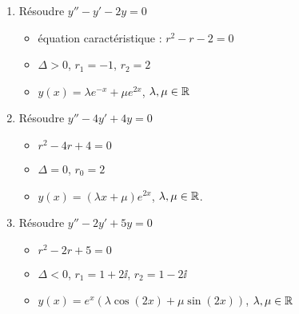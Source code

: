 \begin{frame}
\begin{exemple}
\begin{enumerate}
  \item Résoudre $y'' - y' - 2y = 0$
  \pause
  \begin{itemize}
    \item équation caractéristique : $r^2 - r - 2 = 0$   
    \pause
    \item $\Delta >0$, $r_1 = -1$, $r_2 = 2$
    \pause
    \item $y(x) = \lambda e^{-x} + \mu e^{2x}$, $\lambda,\mu \in \mathbb{R}$
  \end{itemize}

  \pause\bigskip
  
  \item Résoudre $y'' - 4y' + 4y = 0$
  \pause
  \begin{itemize}
    \item $r^2 - 4r + 4 = 0$
    \pause
    \item $\Delta=0$, $r_0 = 2$
    \pause
    \item $y(x) = (\lambda x + \mu) e^{2x}$, $\lambda,\mu \in \mathbb{R}$.
  \end{itemize}  
  
  \pause\bigskip
  
  \item Résoudre $y'' - 2y' + 5y = 0$
  \pause
   \begin{itemize}
    \item $r^2-2r+5 = 0$
    \pause
    \item $\Delta<0$, $r_1 = 1 + 2\ii$, $r_2 = 1 - 2\ii$
    \pause
    \item $y(x) = e^x (\lambda \cos(2x) + \mu \sin(2x))$,  $\lambda, \mu \in \mathbb{R}$
  \end{itemize} 
\end{enumerate}
\end{exemple}
\end{frame}


